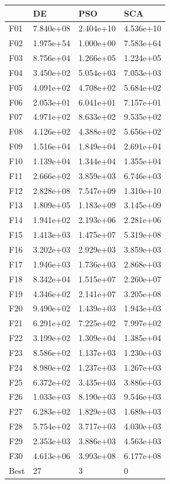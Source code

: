 \begin{tabular}{llll}
\toprule
{} &         DE &        PSO &        SCA \\
\midrule
F01  &  7.840e+08 &  2.404e+10 &  4.536e+10 \\
F02  &  1.975e+54 &  1.000e+00 &  7.583e+64 \\
F03  &  8.756e+04 &  1.266e+05 &  1.224e+05 \\
F04  &  3.450e+02 &  5.054e+03 &  7.053e+03 \\
F05  &  4.091e+02 &  4.708e+02 &  5.684e+02 \\
F06  &  2.053e+01 &  6.041e+01 &  7.157e+01 \\
F07  &  4.971e+02 &  8.633e+02 &  9.535e+02 \\
F08  &  4.126e+02 &  4.388e+02 &  5.656e+02 \\
F09  &  1.516e+04 &  1.849e+04 &  2.691e+04 \\
F10  &  1.139e+04 &  1.344e+04 &  1.355e+04 \\
F11  &  2.666e+02 &  3.859e+03 &  6.746e+03 \\
F12  &  2.828e+08 &  7.547e+09 &  1.310e+10 \\
F13  &  1.809e+05 &  1.183e+09 &  3.145e+09 \\
F14  &  1.941e+02 &  2.193e+06 &  2.281e+06 \\
F15  &  1.413e+03 &  1.475e+07 &  5.319e+08 \\
F16  &  3.202e+03 &  2.929e+03 &  3.859e+03 \\
F17  &  1.946e+03 &  1.736e+03 &  2.868e+03 \\
F18  &  8.342e+04 &  1.515e+07 &  2.260e+07 \\
F19  &  4.346e+02 &  2.141e+07 &  3.205e+08 \\
F20  &  9.490e+02 &  1.439e+03 &  1.943e+03 \\
F21  &  6.291e+02 &  7.225e+02 &  7.997e+02 \\
F22  &  3.199e+02 &  1.309e+04 &  1.385e+04 \\
F23  &  8.586e+02 &  1.137e+03 &  1.230e+03 \\
F24  &  8.980e+02 &  1.237e+03 &  1.267e+03 \\
F25  &  6.372e+02 &  3.435e+03 &  3.886e+03 \\
F26  &  1.033e+03 &  8.190e+03 &  9.546e+03 \\
F27  &  6.283e+02 &  1.829e+03 &  1.689e+03 \\
F28  &  5.754e+02 &  3.717e+03 &  4.030e+03 \\
F29  &  2.353e+03 &  3.886e+03 &  4.563e+03 \\
F30  &  4.613e+06 &  3.993e+08 &  6.177e+08 \\
Best &         27 &          3 &          0 \\
\bottomrule
\end{tabular}

